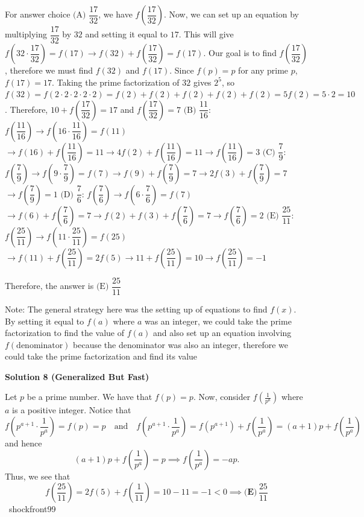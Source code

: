 \begin{enumerate}
 For answer choice $\text{(A) }\dfrac{17}{32}$, we have $f\left(\dfrac{17}{32}\right)$. Now, we can set up an equation by multiplying $\dfrac{17}{32}$ by $32$ and setting it equal to $17$. This will give $f\left(32\cdot\dfrac{17}{32}\right)=f(17)\rightarrow f(32)+f\left(\dfrac{17}{32}\right)=f(17)$. Our goal is to find $f\left(\dfrac{17}{32}\right)$, therefore we must find $f(32)$ and $f(17)$. Since $f(p)=p$ for any prime $p$, $f(17)=17$. Taking the prime factorization of $32$ gives $2^5$, so $f(32)=f(2\cdot2\cdot2\cdot2\cdot2)=f(2)+f(2)+f(2)+f(2)+f(2)=5f(2)=5\cdot2=10$. Therefore, $10+f\left(\dfrac{17}{32}\right)=17$ and $f\left(\dfrac{17}{32}\right)=7$
$\text{(B) }\dfrac{11}{16}$: $f\left(\dfrac{11}{16}\right)\rightarrow f\left(16\cdot\dfrac{11}{16}\right)=f(11)$$\rightarrow f(16)+f\left(\dfrac{11}{16}\right)=11\rightarrow 4f(2)+f\left(\dfrac{11}{16}\right)=11$$\rightarrow f\left(\dfrac{11}{16}\right)=3$
$\text{(C) }\dfrac{7}{9}$: $f\left(\dfrac{7}{9}\right)\rightarrow f\left(9\cdot\dfrac{7}{9}\right)=f(7)$$\rightarrow f(9)+f\left(\dfrac{7}{9}\right)=7\rightarrow 2f(3)+f\left(\dfrac{7}{9}\right)=7$$\rightarrow f\left(\dfrac{7}{9}\right)=1$
$\text{(D) }\dfrac{7}{6}$: $f\left(\dfrac{7}{6}\right)\rightarrow f\left(6\cdot\dfrac{7}{6}\right)=f(7)$$\rightarrow f(6)+f\left(\dfrac{7}{6}\right)=7\rightarrow f(2)+f(3)+f\left(\dfrac{7}{6}\right)=7$$\rightarrow f\left(\dfrac{7}{6}\right)=2$
$\text{(E) }\dfrac{25}{11}$: $f\left(\dfrac{25}{11}\right)\rightarrow f\left(11\cdot\dfrac{25}{11}\right)=f(25)$$\rightarrow f(11)+f\left(\dfrac{25}{11}\right)=2f(5)\rightarrow 11+f\left(\dfrac{25}{11}\right)=10$$\rightarrow f\left(\dfrac{25}{11}\right)=-1$

 Therefore, the answer is $\boxed{\text{(E) }\dfrac{25}{11}}$

 Note: The general strategy here was the setting up of equations to find $f(x)$. By setting it equal to $f(a)$ where $a$ was an integer, we could take the prime factorization to find the value of $f(a)$ and also set up an equation involving $f(\text{denominator})$ because the denominator was also an integer, therefore we could take the prime factorization and find its value

 



\textbf{Solution 8 (Generalized But Fast)}

Let $p$ be a prime number. We have that $f(p)=p.$ Now, consider $f\left(\frac1{p^a}\right)$ where $a$ is a positive integer. Notice that
 \[f\left(p^{a+1}\cdot\frac1{p^a}\right)=f(p)=p\quad\text{and}\quad f\left(p^{a+1}\cdot\frac1{p^a}\right)=f(p^{a+1})+f\left(\frac1{p^a}\right)=(a+1)p+f\left(\frac1{p^a}\right)\]and hence
 \[(a+1)p+f\left(\frac1{p^a}\right)=p\implies f\left(\frac1{p^a}\right)=-ap.\]Thus, we see that
 \[f\left(\frac{25}{11}\right)=2f(5)+f\left(\frac1{11}\right)=10-11=-1<0\implies \boxed{\textbf{(E)}\,\frac{25}{11}}\]~shockfront99


\end{enumerate}
